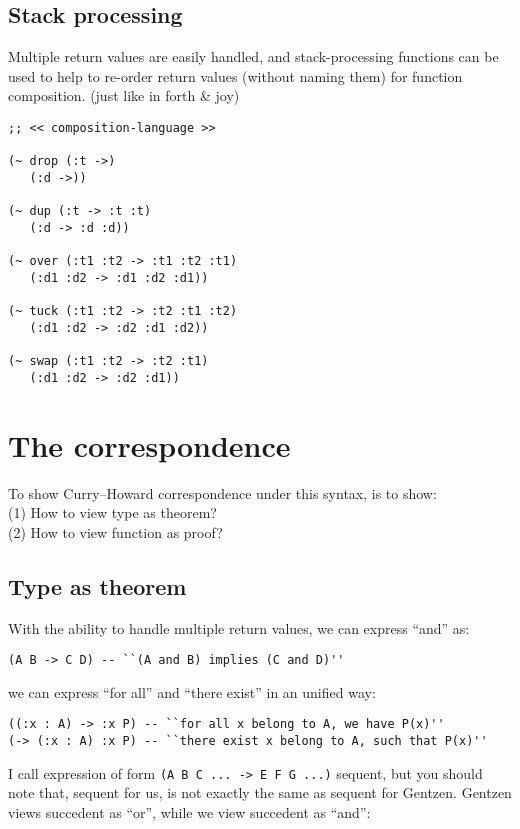 \documentclass[numbers]{sigplanconf}
\begin{document}
\subsection{Stack processing}

Multiple return values are easily handled,
and stack-processing functions can be used to help to
re-order return values (without naming them) for function composition.
(just like in forth \& joy)

{\scriptsize\begin{verbatim}
;; << composition-language >>

(~ drop (:t ->)
   (:d ->))

(~ dup (:t -> :t :t)
   (:d -> :d :d))

(~ over (:t1 :t2 -> :t1 :t2 :t1)
   (:d1 :d2 -> :d1 :d2 :d1))

(~ tuck (:t1 :t2 -> :t2 :t1 :t2)
   (:d1 :d2 -> :d2 :d1 :d2))

(~ swap (:t1 :t2 -> :t2 :t1)
   (:d1 :d2 -> :d2 :d1))
\end{verbatim}}


\section{The correspondence}

To show Curry--Howard correspondence under this syntax,
is to show: \\
(1) How to view type as theorem? \\
(2) How to view function as proof?

\subsection{Type as theorem}

With the ability to handle multiple return values,
we can express ``and'' as:

{\scriptsize\begin{verbatim}
(A B -> C D) -- ``(A and B) implies (C and D)''
\end{verbatim}}

we can express ``for all'' and ``there exist'' in an unified way:

{\scriptsize\begin{verbatim}
((:x : A) -> :x P) -- ``for all x belong to A, we have P(x)''
(-> (:x : A) :x P) -- ``there exist x belong to A, such that P(x)''
\end{verbatim}}

I call expression of form {\scriptsize\verb|(A B C ... -> E F G ...)|} sequent,
but you should note that,
sequent for us, is not exactly the same as sequent for Gentzen\cite{Gentzen}.
Gentzen views succedent as ``or'', while we view succedent as ``and'':
\end{document}
